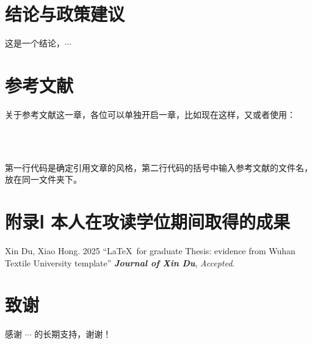 \documentclass[]{WTUthesis}
\begin{document}
	\chapter{结论与政策建议}
	
	这是一个结论，$\cdots$
	
	\chapter*{参考文献}
	
	关于参考文献这一章，各位可以单独开启一章，比如现在这样，又或者使用：
	
	\begin{lstlisting}
		
		
	\end{lstlisting}
	
	第一行代码是确定引用文章的风格，第二行代码的括号中输入参考文献的文件名，放在同一文件夹下。
	
	\chapter*{附录Ⅰ 本人在攻读学位期间取得的成果}
	
	\noindent Xin Du, Xiao Hong. 2025 ``\LaTeX\ for graduate Thesis: evidence from Wuhan Textile University template'' \textbf{\textit{Journal of Xin Du}}, \textit{Accepted}.
	
	\chapter*{致谢}
	
	感谢 $\cdots$ 的长期支持，谢谢！
	
\end{document}
